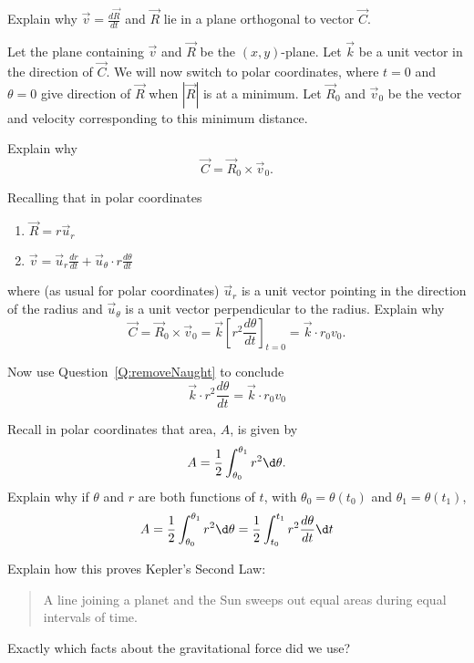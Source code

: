\documentclass{ximera}
\begin{document}
\begin{question}
Explain why $\vec{v}=\frac{d\vec{R}}{dt}$ and $\vec{R}$ lie in a plane
orthogonal to vector $\vec{C}$.
\end{question}

Let the plane containing $\vec{v}$ and $\vec{R}$ be the
$(x,y)$-plane. Let $\vec{k}$ be a unit vector in the direction of
$\vec{C}$. We will now switch to polar coordinates, where $t=0$ and
$\theta=0$ give direction of $\vec{R}$ when $|\vec{R}|$ is at a
minimum. Let $\vec{R}_0$ and $\vec{v}_0$ be the vector and velocity
corresponding to this minimum distance.

\begin{question}
Explain why 
\[
\vec{C} = \vec{R}_0\times \vec{v}_0.
\]
\end{question}


\begin{question}
Recalling that in polar coordinates
\begin{enumerate}
\item $\vec{R} = r\vec{u}_r$
\item $\vec{v} = \vec{u}_r \frac{dr}{dt} + \vec{u}_\theta \cdot r \frac{d\theta}{dt}$
\end{enumerate}
where (as usual for polar coordinates) $\vec{u}_r$ is a unit vector
pointing in the direction of the radius and $\vec{u}_\theta$ is a unit
vector perpendicular to the radius. Explain why
\[
\vec{C}=\vec{R}_0\times \vec{v}_0 = \vec{k} \left[r^2 \frac{d\theta}{dt}\right]_{t=0}= \vec{k} \cdot r_0v_0.
\]
\end{question}

\begin{question}
Now use Question~\ref{Q:removeNaught} to conclude
\[
\vec{k} \cdot r^2 \frac{d\theta}{dt}= \vec{k} \cdot r_0v_0
\]
\end{question}



\begin{question}
Recall in polar coordinates that area, $A$, is given by
\[
A = \frac{1}{2}\int_{\theta_0}^{\theta_1} r^2\d\theta. 
\]
Explain why if $\theta$ and $r$ are both functions of $t$, with
$\theta_0 = \theta(t_0)$ and $\theta_1 = \theta(t_1)$,
\[
A =  \frac{1}{2}\int_{\theta_0}^{\theta_1} r^2\d\theta = \frac{1}{2}\int_{t_0}^{t_1} r^2 \frac{d\theta}{dt} \d t 
\]
\end{question}


\begin{question}
Explain how this proves Kepler's Second Law:
\begin{quote}
A line joining a planet and the Sun sweeps out equal areas during equal intervals of time.
\end{quote}
Exactly which facts about the gravitational force did we use?
\end{question}
\end{document}
